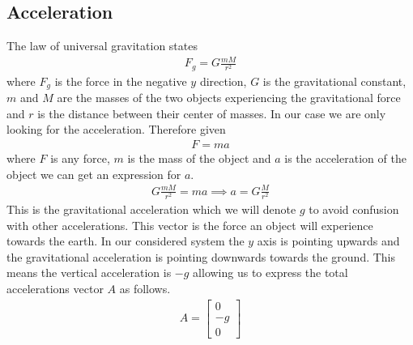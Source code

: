 \documentclass[%
aip,
jmp,
amsmath,amssymb,
reprint,%
]{revtex4-1}
\begin{document}
	\subsection{Acceleration}
	The law of universal gravitation states
	\begin{align}\nonumber
		F_g = G\frac{mM}{r^2}
	\end{align}
	where $F_g$ is the force in the negative $y$ direction, $G$ is the gravitational constant, $m$ and $M$ are the masses of the two objects experiencing the gravitational force and $r$ is the distance between their center of masses. In our case we are only looking for the acceleration. Therefore given
	\begin{align}\nonumber
		F=ma
	\end{align}
	where $F$ is any force, $m$ is the mass of the object and $a$ is the acceleration of the object we can get an expression for $a$.
	\begin{align}\nonumber
		G\frac{mM}{r^2} = ma \implies a=G\frac{M}{r^2}	
	\end{align}
	This is the gravitational acceleration which we will denote $g$ to avoid confusion with other accelerations. This vector is the force an object will experience towards the earth. In our considered system the $y$ axis is pointing upwards and the gravitational acceleration is pointing downwards towards the ground. This means the vertical acceleration is $-g$ allowing us to express the total accelerations vector $A$ as follows.
	\begin{align}\nonumber
		A=
		\begin{bmatrix} 
			0 \\
			-g \\ 
			0
		\end{bmatrix}
	\end{align}
\end{document}
